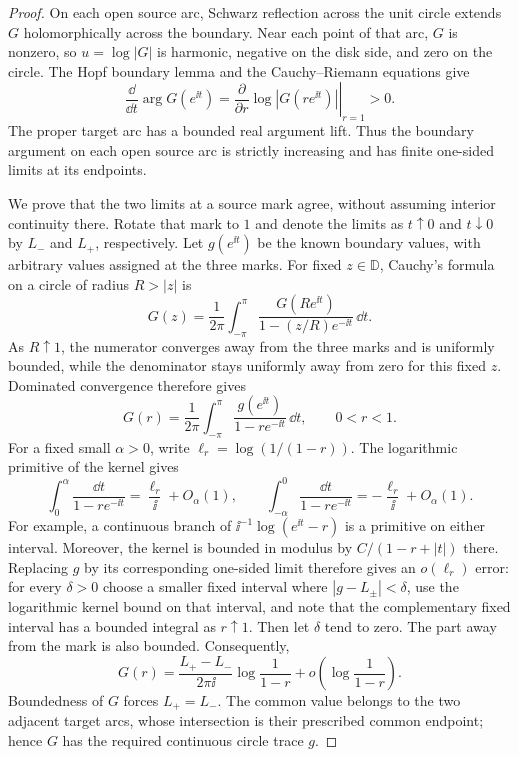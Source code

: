 \begin{proof}
On each open source arc, Schwarz reflection across the unit circle
extends $G$ holomorphically across the boundary. Near each point of that
arc, $G$ is nonzero, so $u=\log|G|$ is harmonic, negative on the disk
side, and zero on the circle. The Hopf boundary lemma and the
Cauchy--Riemann equations give
\[
 \frac{\dd}{\dd t}\arg G(e^{\ii t})
    =\left.\frac{\partial}{\partial r}\log|G(re^{\ii t})|\right|_{r=1}
    >0.
\]
The proper target arc has a bounded real argument lift. Thus the
boundary argument on each open source arc is strictly increasing and
has finite one-sided limits at its endpoints.

We prove that the two limits at a source mark agree, without assuming
interior continuity there. Rotate that mark to $1$ and denote the limits
as $t\uparrow0$ and $t\downarrow0$ by $L_-$ and $L_+$, respectively.
Let $g(e^{\ii t})$ be the known boundary values, with arbitrary values
assigned at the three marks. For fixed $z\in\mathbb D$, Cauchy's formula
on a circle of radius $R>|z|$ is
\[
 G(z)=\frac1{2\pi}\int_{-\pi}^{\pi}
       \frac{G(Re^{\ii t})}{1-(z/R)e^{-\ii t}}\,\dd t.
\]
As $R\uparrow1$, the numerator converges away from the three marks and
is uniformly bounded, while the denominator stays uniformly away from
zero for this fixed $z$. Dominated convergence therefore gives
\[
 G(r)=\frac1{2\pi}\int_{-\pi}^{\pi}
                 \frac{g(e^{\ii t})}{1-re^{-\ii t}}\,\dd t,
                 \qquad 0<r<1.
\]
For a fixed small $\alpha>0$, write $\ell_r=\log(1/(1-r))$. The
logarithmic primitive of the kernel gives
\[
 \int_0^\alpha\frac{\dd t}{1-re^{-\ii t}}
       =\frac{\ell_r}{\ii}+O_\alpha(1),\qquad
 \int_{-\alpha}^0\frac{\dd t}{1-re^{-\ii t}}
       =-\frac{\ell_r}{\ii}+O_\alpha(1).
\]
For example, a continuous branch of
$\ii^{-1}\log(e^{\ii t}-r)$ is a primitive on either interval.
Moreover, the kernel is bounded in modulus by
$C/(1-r+|t|)$ there. Replacing $g$ by its corresponding one-sided
limit therefore gives an $o(\ell_r)$ error: for every $\delta>0$ choose
a smaller fixed interval where $|g-L_\pm|<\delta$, use the logarithmic
kernel bound on that interval, and note that the complementary fixed
interval has a bounded integral as $r\uparrow1$. Then let $\delta$ tend
to zero. The part away from the mark is also bounded. Consequently,
\begin{equation}
 G(r)=\frac{L_+-L_-}{2\pi\ii}\log\frac1{1-r}
            +o\!\left(\log\frac1{1-r}\right).
 \label{observable:jump}
\end{equation}
Boundedness of $G$ forces $L_+=L_-$. The common value belongs to the two
adjacent target arcs, whose intersection is their prescribed common
endpoint; hence $G$ has the required continuous circle trace $g$.


\end{proof}
